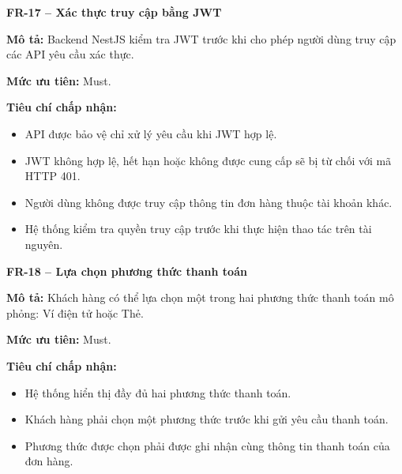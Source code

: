 \documentclass[a4paper]{article}
\begin{document}
\par\ifdim\dimexpr\pagegoal-\pagetotal\relax<6\baselineskip\newpage\fi
{}

\noindent\textbf{FR-17 – Xác thực truy cập bằng JWT}\par\nopagebreak
\begin{list}{}{%
    \setlength{\leftmargin}{0.8cm}%
    \setlength{\rightmargin}{0pt}%
    \setlength{\labelwidth}{0pt}%
    \setlength{\labelsep}{0pt}%
    \setlength{\itemindent}{0pt}%
    \setlength{\listparindent}{0pt}%
    \setlength{\itemsep}{5pt}%
    \setlength{\parsep}{0pt}%
    \setlength{\topsep}{5pt}%
}
\item[] \textbf{Mô tả:} Backend NestJS kiểm tra JWT trước khi cho phép người dùng truy cập các API yêu cầu xác thực.
\item[] \textbf{Mức ưu tiên:} Must.
\item[] \textbf{Tiêu chí chấp nhận:} 
\begin{itemize}
\item API được bảo vệ chỉ xử lý yêu cầu khi JWT hợp lệ.
\item JWT không hợp lệ, hết hạn hoặc không được cung cấp sẽ bị từ chối với mã HTTP 401.
\item Người dùng không được truy cập thông tin đơn hàng thuộc tài khoản khác.
\item Hệ thống kiểm tra quyền truy cập trước khi thực hiện thao tác trên tài nguyên.
\end{itemize}
\end{list}

\par\ifdim\dimexpr\pagegoal-\pagetotal\relax<6\baselineskip\newpage\fi
{}

\noindent\textbf{FR-18 – Lựa chọn phương thức thanh toán}\par\nopagebreak
\begin{list}{}{%
    \setlength{\leftmargin}{0.8cm}%
    \setlength{\rightmargin}{0pt}%
    \setlength{\labelwidth}{0pt}%
    \setlength{\labelsep}{0pt}%
    \setlength{\itemindent}{0pt}%
    \setlength{\listparindent}{0pt}%
    \setlength{\itemsep}{5pt}%
    \setlength{\parsep}{0pt}%
    \setlength{\topsep}{5pt}%
}
\item[] \textbf{Mô tả:} Khách hàng có thể lựa chọn một trong hai phương thức thanh toán mô phỏng: Ví điện tử hoặc Thẻ.
\item[] \textbf{Mức ưu tiên:} Must.
\item[] \textbf{Tiêu chí chấp nhận:} 
\begin{itemize}
\item Hệ thống hiển thị đầy đủ hai phương thức thanh toán.
\item Khách hàng phải chọn một phương thức trước khi gửi yêu cầu thanh toán.
\item Phương thức được chọn phải được ghi nhận cùng thông tin thanh toán của đơn hàng.
\end{itemize}
\end{list}
\end{document}

